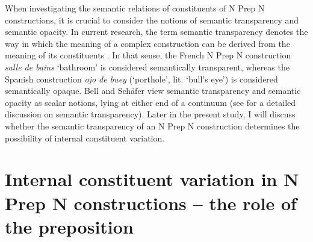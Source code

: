 \documentclass[output=paper]{langsci/langscibook}
\begin{document}
When investigating the semantic relations of constituents of N Prep N constructions, it is crucial to consider the notions of semantic transparency and semantic opacity. In current research, the term semantic transparency denotes the way in which the meaning of a complex construction can be derived from the meaning of its constituents \citep{Zwitserlood:1994}. In that sense, the French N Prep N construction \textit{salle de bains} `bathroom' is considered semantically transparent, whereas the Spanish construction \textit{ojo de buey} (`porthole', lit. `bull's eye') is considered semantically opaque. Bell and Schäfer view semantic transparency and semantic opacity as scalar notions, lying at either end of a continuum (see \citet{Bell:2016} for a detailed discussion on semantic transparency). Later in the present study, I will discuss whether the semantic transparency of an N Prep N construction determines the possibility of internal constituent variation.

\section{Internal constituent variation in N Prep N constructions – the role of the preposition} 
\end{document}

